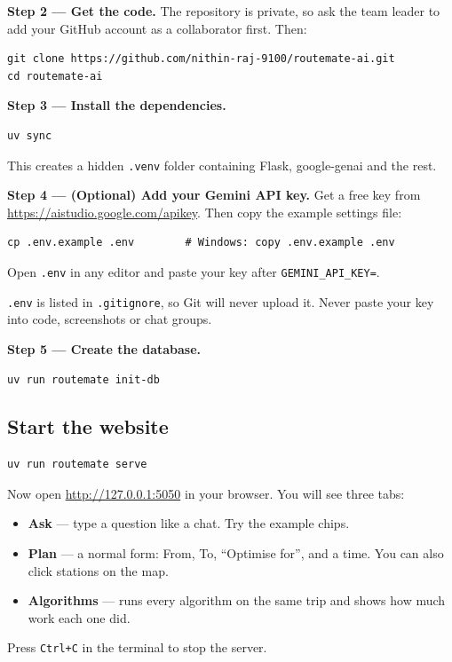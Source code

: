 \documentclass[11pt,a4paper]{article}
\begin{document}
\textbf{Step 2 --- Get the code.} The repository is private, so ask the team leader to add
your GitHub account as a collaborator first. Then:
\begin{lstlisting}[style=shell]
git clone https://github.com/nithin-raj-9100/routemate-ai.git
cd routemate-ai
\end{lstlisting}

\textbf{Step 3 --- Install the dependencies.}
\begin{lstlisting}[style=shell]
uv sync
\end{lstlisting}
This creates a hidden \texttt{.venv} folder containing Flask, google-genai and the rest.

\textbf{Step 4 --- (Optional) Add your Gemini API key.} Get a free key from
\url{https://aistudio.google.com/apikey}. Then copy the example settings file:
\begin{lstlisting}[style=shell]
cp .env.example .env        # Windows: copy .env.example .env
\end{lstlisting}
Open \texttt{.env} in any editor and paste your key after \texttt{GEMINI\_API\_KEY=}.

\begin{tip}
\texttt{.env} is listed in \texttt{.gitignore}, so Git will never upload it. Never paste your
key into code, screenshots or chat groups.
\end{tip}

\textbf{Step 5 --- Create the database.}
\begin{lstlisting}[style=shell]
uv run routemate init-db
\end{lstlisting}

\subsection{Start the website}

\begin{lstlisting}[style=shell]
uv run routemate serve
\end{lstlisting}
Now open \url{http://127.0.0.1:5050} in your browser. You will see three tabs:
\begin{itemize}
  \item \textbf{Ask} --- type a question like a chat. Try the example chips.
  \item \textbf{Plan} --- a normal form: From, To, ``Optimise for'', and a time.
        You can also click stations on the map.
  \item \textbf{Algorithms} --- runs every algorithm on the same trip and shows how much
        work each one did.
\end{itemize}
Press \texttt{Ctrl+C} in the terminal to stop the server.
\end{document}
